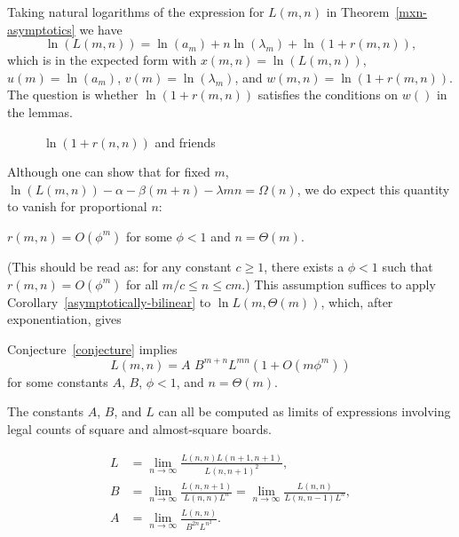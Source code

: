 \documentclass{article}
\begin{document}
Taking natural logarithms of the expression for $L(m,n)$ in
Theorem~\ref{mxn-asymptotics} we have
\[
\ln(L(m,n)) = \ln(a_m) + n \ln(\lambda_m) + \ln(1+r(m,n)),
\]
which is in the expected form with $x(m,n) = \ln(L(m,n))$,
$u(m) = \ln(a_m)$, $v(m) = \ln(\lambda_m)$, and $w(m,n) =
\ln(1+r(m,n))$. The question is whether $\ln(1+r(m,n))$ satisfies
the conditions on $w()$ in the lemmas.

\begin{figure}
\begin{center}
\epsfxsize=10cm 
\end{center}
\caption{$\ln(1+r(n,n))$ and friends}
\label{logr}
\end{figure}

Although one can show that for fixed $m$,
$\ln(L(m,n)) - \alpha - \beta(m + n) - \lambda mn = \Omega(n)$,
we do expect this quantity to vanish for proportional $n$:

\begin{conj}
  \label{conjecture}
  $r(m,n) = O(\phi^m)$ for some $\phi < 1$ and  $n=\Theta(m)$.
\end{conj}

(This should be read as: for any constant $c \geq 1$,
 there exists a $\phi < 1$ such that
 $r(m,n) = O(\phi^m)$ for all $m/c \leq n \leq cm$.)
This assumption suffices to apply
Corollary~\ref{asymptotically-bilinear} to $\ln L(m,\Theta(m))$,
which, after exponentiation, gives

\begin{theorem}
Conjecture~\ref{conjecture} implies
  \label{asymptotic-formula}
  \[
  L(m,n) = A\,\, B^{m+n} L^{mn} (1+O(m\phi^m))
  \]
  for some constants $A$, $B$, $\phi<1$, and $n=\Theta(m)$.
\end{theorem}

The constants $A$, $B$, and $L$ can all be computed as limits of
expressions involving legal counts of square and almost-square boards.

\begin{coro}
  \[
  \begin{split}
    L &= \lim_{n \rightarrow \infty} \frac{L(n,n)L(n+1,n+1)}{L(n,n+1)^2}, \\
    B &= \lim_{n \rightarrow \infty} \frac{L(n,n+1)}{L(n,n)L^n}
      = \lim_{n \rightarrow \infty}
    \frac{L(n,n)}{L(n,n-1)L^n}, \\ 
    A &= \lim_{n \rightarrow \infty}
    \frac{L(n,n)}{B^{2n} L^{n^2}}.
  \end{split}
  \]
\end{coro}
\end{document}
